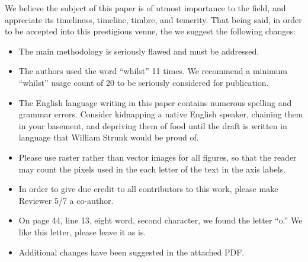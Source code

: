 \documentclass[12pt]{sigbovik-review}
\author{Reviewer 5/7}
\begin{document}
\maketitle

We believe the subject of this paper is of utmost importance to the field, and appreciate its timeliness, timeline, timbre, and temerity. 
That being said, in order to be accepted into this prestigious venue, the we suggest the following changes:
\begin{itemize}
    \item The main methodology is seriously flawed and must be addressed.
    \item The authors used the word ``whilst'' 11 times. We recommend a minimum ``whilst'' usage count of 20 to be seriously considered for publication.
    \item The English language writing in this paper contains numerous spelling and grammar errors. Consider kidnapping a native English speaker, chaining them in your basement, and depriving them of food until the draft is written in language that William Strunk would be proud of.
    \item Please use raster rather than vector images for all figures, so that the reader may count the pixels used in the each letter of the text in the axis labels.
    \item In order to give due credit to all contributors to this work, please make Reviewer 5/7 a co-author.
    \item On page 44, line 13, eight word, second character, we found the letter ``o.'' We like this letter, please leave it as is.
    \item Additional changes have been suggested in the attached PDF. 
    
\end{itemize}
\end{document}
